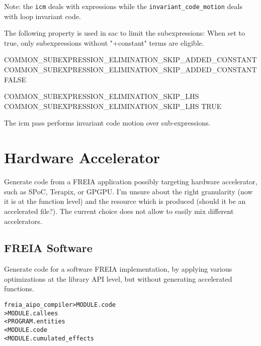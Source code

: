 \documentclass[a4paper]{report}
\newenvironment{PipsMake}{\begin{alltt}}{\end{alltt}}
\newenvironment{PipsPass}[1]{\label{pass:#1}}{}
\begin{document}
Note: the \verb/icm/ deals with expressions while
the \verb/invariant_code_motion/ deals with loop invariant code.

The following property is used in sac to limit the subexpressions:
When set to true, only subexpressions without "+constant" terms are eligible.
\begin{PipsProp}{COMMON_SUBEXPRESSION_ELIMINATION_SKIP_ADDED_CONSTANT}
COMMON_SUBEXPRESSION_ELIMINATION_SKIP_ADDED_CONSTANT FALSE
\end{PipsProp}

\begin{PipsProp}{COMMON_SUBEXPRESSION_ELIMINATION_SKIP_LHS}
COMMON_SUBEXPRESSION_ELIMINATION_SKIP_LHS TRUE
\end{PipsProp}

\begin{PipsPass}{icm}
The icm pass performs invariant code motion over sub-expressions.
\end{PipsPass}




\section{Hardware Accelerator}
\label{hardware-accelerator}

Generate code from a FREIA application possibly targeting hardware
accelerator, such as SPoC, Terapix, or GPGPU.
I'm unsure about the right granularity (now it is at the function
level) and the resource which is produced (should it be an accelerated
file?). The current choice does not allow to easily mix different
accelerators.

\subsection{FREIA Software}
\label{hwac-freia-software}

Generate code for a software FREIA implementation, by applying various
optimizations at the library API level, but without generating accelerated
functions.

\begin{PipsMake}
freia_aipo_compiler   > MODULE.code
                      > MODULE.callees
        < PROGRAM.entities
        < MODULE.code
        < MODULE.cumulated_effects
\end{PipsMake}
\end{document}
